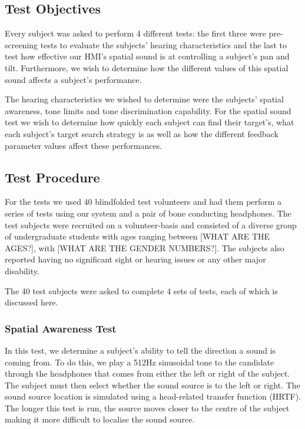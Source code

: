 \documentclass[format=sigconf, review=true, screen=true, anonymous=true]{acmart}
\begin{document}
\subsection{Test Objectives}

Every subject was asked to perform 4 different tests: the first three were pre-screening tests to evaluate the subjects' hearing characteristics and the last to test how effective our HMI's spatial sound is at controlling a subject's pan and tilt. Furthermore, we wish to determine how the different values of this spatial sound affects a subject's performance. 

The hearing characteristics we wished to determine were the subjects' spatial awareness, tone limits and tone discrimination capability. For the spatial sound test we wish to determine how quickly each subject can find their target's, what each subject's target search strategy is as well as how the different feedback parameter values affect these performances. 

\subsection{Test Procedure}

For the tests we used 40 blindfolded test volunteers and had them perform a series of tests using our system and a pair of bone conducting headphones. The test subjects were recruited on a volunteer-basis and consisted of a diverse group of undergraduate students with ages ranging between [WHAT ARE THE AGES?], with [WHAT ARE THE GENDER NUMBERS?]. The subjects also reported having no significant sight or hearing issues or any other major disability. 

The 40 test subjects were asked to complete 4 sets of tests, each of which is discussed here.

\subsubsection{Spatial Awareness Test}

In this test, we determine a subject's ability to tell the direction a sound is coming from. To do this, we play a 512Hz sinusoidal tone to the candidate through the headphones that comes from either the left or right of the subject. The subject must then select whether the sound source is to the left or right. The sound source location is simulated using a head-related transfer function (HRTF). The longer this test is run, the source moves closer to the centre of the subject making it more difficult to localise the sound source. 
\end{document}
